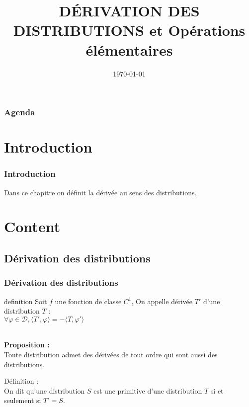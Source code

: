 \documentclass{beamer}
\title{DÉRIVATION DES DISTRIBUTIONS et Opérations élémentaires}
\author{}
\date{\today}
\begin{document}
\frame{\titlepage} %

\begin{frame}
\frametitle{Agenda}
\tableofcontents %
\end{frame}

\section{Introduction}
\begin{frame}
\frametitle{Introduction}
Dans ce chapitre on définit la dérivée au sens des distributions.
\end{frame}



\section{Content}
\subsection{Dérivation des distributions}
\begin{frame}
\frametitle{Dérivation des distributions}
\begin{block}{definition}
Soit $f$ une fonction de classe $C^1$, On appelle dérivée $T'$ d'une distribution $T$ :\\
\hspace{1cm}\hspace{1cm}\hspace{1cm}\hspace{1cm} $\forall \varphi \in \mathcal{D}, \langle T', \varphi \rangle = -\langle T, \varphi' \rangle$
\end{block}
\\
\textbf{Proposition :}
\\
Toute distribution admet des dérivées de tout ordre qui sont aussi des distributions.
\\
\begin{block}{Définition :} \\
On dit qu'une distribution $S$ est une primitive d'une distribution $T$ si et seulement si $T' = S$.
\end{block}


\end{frame}
\end{document}
